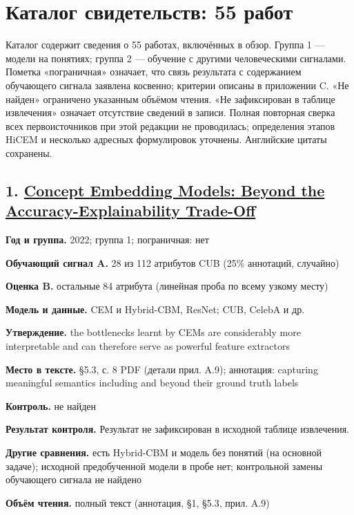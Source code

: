 \section{Каталог свидетельств: 55 работ}\label{app:catalog}

Каталог содержит сведения о 55 работах, включённых в обзор. Группа 1 — модели на понятиях; группа 2 — обучение с другими человеческими сигналами. Пометка «пограничная» означает, что связь результата с содержанием обучающего сигнала заявлена косвенно; критерии описаны в приложении C. «Не найден» ограничено указанным объёмом чтения. «Не зафиксирован в таблице извлечения» означает отсутствие сведений в записи. Полная повторная сверка всех первоисточников при этой редакции не проводилась; определения этапов HiCEM и несколько адресных формулировок уточнены. Английские цитаты сохранены.


\subsection*{1. \href{https://doi.org/10.48550/arxiv.2209.09056}{Concept Embedding Models: Beyond the Accuracy-Explainability Trade-Off}}

\textbf{Год и группа.} 2022; группа 1; пограничная: нет

\textbf{Обучающий сигнал A.} 28 из 112 атрибутов CUB (25\% аннотаций, случайно)

\textbf{Оценка B.} остальные 84 атрибута (линейная проба по всему узкому месту)

\textbf{Модель и данные.} CEM и Hybrid-CBM, ResNet; CUB, CelebA и др.

\textbf{Утверждение.} the bottlenecks learnt by CEMs are considerably more interpretable and can therefore serve as powerful feature extractors

\textbf{Место в тексте.} §5.3, с. 8 PDF (детали прил. A.9); аннотация: capturing meaningful semantics including and beyond their ground truth labels

\textbf{Контроль.} не найден

\textbf{Результат контроля.} Результат не зафиксирован в исходной таблице извлечения.

\textbf{Другие сравнения.} есть Hybrid-CBM и модель без понятий (на основной задаче); исходной предобученной модели в пробе нет; контрольной замены обучающего сигнала не найдено

\textbf{Объём чтения.} полный текст (аннотация, §1, §5.3, прил. A.9)


